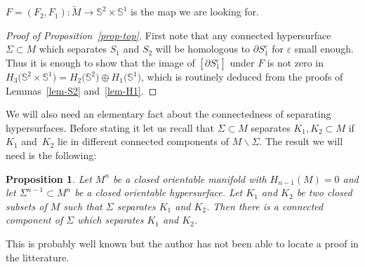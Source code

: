 \documentclass[10pt,a4paper]{amsart}
\numberwithin{equation}{section}
\newtheorem{prop}[thm]{Proposition}
{ \theoremstyle{definition}
\newtheorem{dfn}[thm]{Definition}
\newtheorem{Note}[thm]{Note}
\newtheorem{ex}[thm]{Example}
\newtheorem{rem}[thm]{Remark} }
\newcommand{\eps}{\varepsilon}
\begin{document}
$F=(F_2,F_1)\colon \tilde M\to \mathbb{S}^2\times\mathbb{S}^1$ is the map we
are looking for.

\begin{proof}[Proof of Proposition~\ref{prop-top}]
First note that any connected hypersurface $\Sigma\subset M$ which separates $S_1$ and $S_2$
will be homologous to $\partial S_1^\eps$ for $\eps$ small
enough. Thus it is enough to show that the image of $[\partial
S_1^\eps]$ under $F$ is not zero in
$H_3\big(\mathbb{S}^2\times\mathbb{S}^1\big)=H_2\big(\mathbb{S}^2)\oplus
H_1(\mathbb{S}^1\big)$, which is routinely deduced from the proofs of
Lemmas~\ref{lem-S2} and~\ref{lem-H1}.
\end{proof}

We will also need an elementary fact about the connectedness of separating hypersurfaces. Before stating it let us recall that $\Sigma\subset M$ separates $K_1, K_2 \subset M$ if~$K_1$ and~$K_2$ lie in different connected components of $M\backslash\Sigma$. The result we will need is the following:

\begin{prop}\label{prop-connect}
 Let $M^n$ be a closed orientable manifold with $H_{n-1}(M) = 0$ and
 let \mbox{$\Sigma^{n-1}\!\subset\! M^n$} be a closed orientable
 hypersurface. Let $K_1$ and $K_2$ be two closed subsets of $M$ such
 that $\Sigma$ separates $K_1$ and $K_2$. Then there is a connected
 component of $\Sigma$ which separates $K_1$ and $K_2$.
\end{prop}

This is probably well known but the author has not been able to locate a proof in the litterature.
\end{document}

